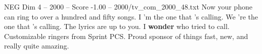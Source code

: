 \begin{textsample}{NEG Dim 4 – 2000 – Score -1.00 – 2000/tv\_com\_2000\_48.txt}  \label{ex:f4_neg_026}
Now your phone can ring to over a hundred and fifty songs.
I 'm the one that 's calling.
We 're the one that 's calling.
The lyrics are up to you.
I \textbf{wonder} who tried to call.
Customizable ringers from Sprint PCS.
Proud sponsor of things fast, new, and really quite amazing.

\end{textsample}
